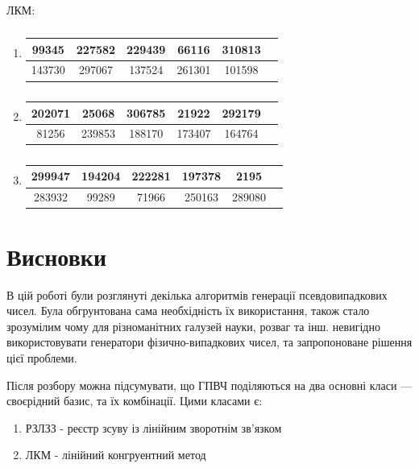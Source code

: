 \documentclass[oneside,final,14pt]{extreport}
\begin{document}
\begin{large}
ЛКМ:
\begin{enumerate}
  \item 
  \begin{table}[H]
	\centering
\begin{tabular}{|c|c|c|c|c|c}
	\hline
	99345 & 227582 & 229439  & 66116 & 310813 \\ \hline
	 143730 & 297067 & 137524 & 261301 & 101598\\ \hline   
\end{tabular}
\caption{}
\label{t:69}
\end{table}
  \item 
  \begin{table}[H]
	\centering
\begin{tabular}{|c|c|c|c|c|c}
	\hline
	202071	& 25068 & 306785 & 21922  & 292179 \\ \hline 
	81256 & 239853 & 188170 & 173407 & 164764\\ \hline   
\end{tabular}
\caption{}
\label{t:69}
\end{table}

  \item 
  \begin{table}[H]
	\centering
\begin{tabular}{|c|c|c|c|c|c}
	\hline
	299947 & 194204 & 222281 & 197378 & 2195 \\ \hline
	 283932 & 99289 & 71966 & 250163 & 289080 \\ \hline   
\end{tabular}
\caption{}
\label{t:610}
\end{table}
\end{enumerate}
\chapter*{Висновки}\label{c:7}
	В цій роботі були розглянуті декілька алгоритмів генерації псевдовипадкових чисел. 
	Була обгрунтована сама необхідність їх використання, також стало зрозумілим чому для 
	різноманітних галузей науки, розваг та інш. невигідно використовувати генератори фізично-випадкових 
	чисел, та запропоноване рішення цієї проблеми. 

	Після розбору можна підсумувати, що ГПВЧ поділяються на два основні класи ---
 своєрідний базис, та їх комбінації. Цими класами є:
 \begin{enumerate}
	\item 
РЗЛЗЗ - реєстр зсуву із лінійним зворотнім зв'язком 
	\item 
ЛКМ - лінійний конгруентний метод
 \end{enumerate}
	

\end{large}
\end{document}
